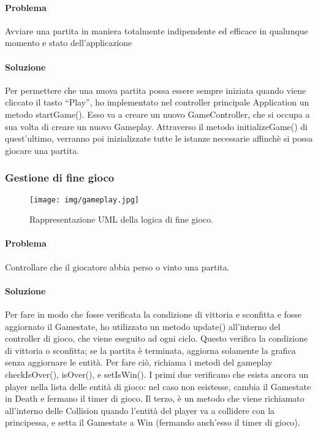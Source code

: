 \paragraph{Problema} Avviare una partita in maniera totalmente indipendente ed efficace in qualunque momento e stato dell’applicazione

\paragraph{Soluzione} Per permettere che una nuova partita possa essere sempre iniziata quando viene cliccato il tasto “Play”, ho implementato nel controller principale Application un metodo startGame(). Esso va a creare un nuovo GameController, che si occupa a sua volta di creare un nuovo Gameplay. Attraverso il metodo initializeGame() di quest’ultimo, verranno poi inizializzate tutte le istanze necessarie affinchè si possa giocare una partita.

\subsubsection{Gestione di fine gioco}

\begin{figure}[H]
\centering{}
\texttt{[image: img/gameplay.jpg]}
\caption{Rappresentazione UML della logica di fine gioco.}
\end{figure}

\paragraph{Problema} Controllare che il giocatore abbia perso o vinto una partita.

\paragraph{Soluzione} Per fare in modo che fosse verificata la condizione di vittoria e sconfitta e fosse aggiornato il Gamestate, ho utilizzato un metodo update() all’interno del controller di gioco, che viene eseguito ad ogni ciclo. Questo verifica la condizione di vittoria o sconfitta; se la partita è terminata, aggiorna solamente la grafica senza aggiornare le entità. Per fare ciò, richiama i metodi del gameplay checkIsOver(), isOver(), e setIsWin(). I primi due verificano che esista ancora un player nella lista delle entità di gioco: nel caso non esistesse, cambia il Gamestate in Death e fermano il timer di gioco. Il terzo, è un metodo che viene richiamato all’interno delle Collision quando l’entità del player va a collidere con la principessa, e setta il Gamestate a Win (fermando anch’esso il timer di gioco).

